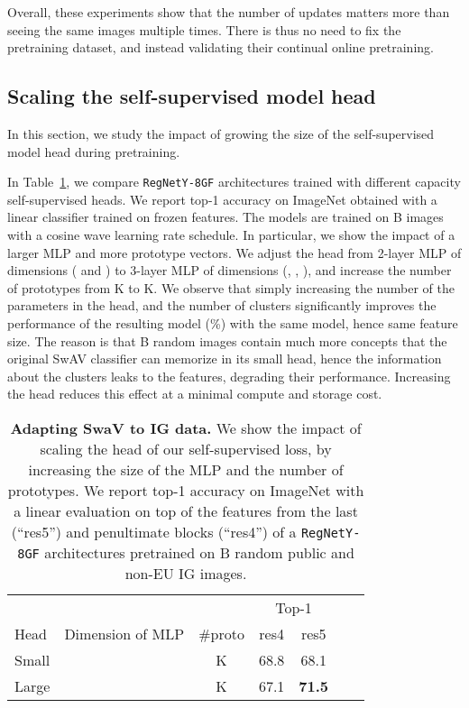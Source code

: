 \documentclass[final]{cvpr}
\begin{document}
Overall, these experiments show that the number of updates matters more than seeing the same images multiple times.
There is thus no need to fix the pretraining dataset, and instead validating their continual online pretraining.


\subsection{Scaling the self-supervised model head}

In this section, we study the impact of growing the size of the self-supervised model head during pretraining.

In Table~\ref{tab:swav}, we compare \texttt{RegNetY-8GF} architectures trained with different capacity self-supervised heads.
We report top-1 accuracy on ImageNet obtained with a linear classifier trained on frozen features.
The models are trained on B images with a cosine wave learning rate schedule.
In particular, we show the impact of a larger MLP and more prototype vectors.
We adjust the head from 2-layer MLP of dimensions ( and ) to 3-layer MLP of dimensions (, , ), and increase the number of prototypes from K to K.
We observe that simply increasing the number of the parameters in the head, and the number of clusters significantly improves the performance of the resulting model (\%) with the same model, hence same feature size.
The reason is that B random images contain much more concepts that the original SwAV classifier can memorize in its small head, hence the information about the clusters leaks to the features, degrading their performance.
Increasing the head reduces this effect at a minimal compute and storage cost.

\begin{table}[t]
\centering
\begin{tabular}{@{}l cc cc cc@{}}
\toprule
&&& \multicolumn{2}{c}{Top-1}\\
\cmidrule{4-5}
Head & Dimension of MLP & \#proto& res4 & res5  \\
\midrule
Small &  & K & 68.8 & 68.1 \\
Large &  & K & 67.1 & \textbf{71.5} \\
\bottomrule
\end{tabular}
\vspace{.3em}
\caption{\textbf{Adapting SwaV to IG data.}
We show the impact of scaling the head of our self-supervised loss, by increasing the size of the MLP and the number of prototypes.
We report top-1 accuracy on ImageNet with a linear evaluation on top of the features from the last (``res5'') and penultimate blocks (``res4'') of a \texttt{RegNetY-8GF} architectures pretrained on B random public and non-EU IG images.
}
\label{tab:swav}
\end{table}
\end{document}
